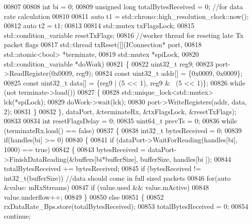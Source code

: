 \begin{DoxyCode}
{{00807 
00808     \textcolor{keywordtype}{int} bi = 0;
00809     \textcolor{keywordtype}{unsigned} \textcolor{keywordtype}{long} totalBytesReceived = 0; \textcolor{comment}{//for data rate calculation}
00810 
00811     \textcolor{keyword}{auto} t1 = std::chrono::high\_resolution\_clock::now();
00812     \textcolor{keyword}{auto} t2 = t1;
00813 
00814     std::mutex txFlagsLock;
00815     std::condition\_variable resetTxFlags;
00816     \textcolor{comment}{//worker thread for reseting late Tx packet flags}
00817     std::thread txReset([](IConnection* port,
00818                         std::atomic<bool> *terminate,
00819                         std::mutex *spiLock,
00820                         std::condition\_variable *doWork)
00821     \{
00822         uint32\_t reg9;
00823         port->ReadRegister(0x0009, reg9);
00824         \textcolor{keyword}{const} uint32\_t addr[] = \{0x0009, 0x0009\};
00825         \textcolor{keyword}{const} uint32\_t data[] = \{reg9 | (5 << 1), reg9 & ~(5 << 1)\};
00826         \textcolor{keywordflow}{while} (not terminate->load())
00827         \{
00828             std::unique\_lock<std::mutex> lck(*spiLock);
00829             doWork->wait(lck);
00830             port->WriteRegisters(addr, data, 2);
00831         \}
00832     \}, dataPort, &terminateRx, &txFlagsLock, &resetTxFlags);
00833 
00834     \textcolor{keywordtype}{int} resetFlagsDelay = 0;
00835     uint64\_t prevTs = 0;
00836     \textcolor{keywordflow}{while} (terminateRx.load() == \textcolor{keyword}{false})
00837     \{
00838         int32\_t bytesReceived = 0;
00839         \textcolor{keywordflow}{if}(handles[bi] >= 0)
00840         \{
00841             \textcolor{keywordflow}{if} (dataPort->WaitForReading(handles[bi], 1000) == \textcolor{keyword}{true})
00842             \{
00843                 bytesReceived = dataPort->FinishDataReading(&buffers[bi*bufferSize], bufferSize, handles[bi
      ]);
00844                 totalBytesReceived += bytesReceived;
00845                 \textcolor{keywordflow}{if} (bytesReceived != int32\_t(bufferSize)) \textcolor{comment}{//data should come in full sized packets}
00846                     \textcolor{keywordflow}{for}(\textcolor{keyword}{auto} &value: mRxStreams)
00847                         \textcolor{keywordflow}{if} (value.used && value.mActive)
00848                             value.underflow++;
00849             \}
00850             \textcolor{keywordflow}{else}
00851             \{
00852                 rxDataRate_Bps.store(totalBytesReceived);
00853                 totalBytesReceived = 0;
00854                 \textcolor{keywordflow}{continue};
}}
\end{DoxyCode}
